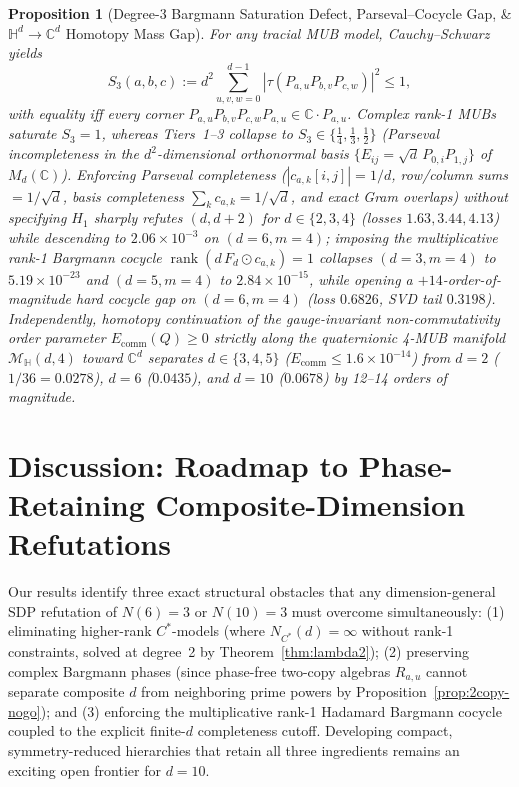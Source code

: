 \documentclass[11pt,a4paper]{article}
\newtheorem{proposition}[theorem]{Proposition}
\theoremstyle{definition}
\newcommand{\C}{\mathbb{C}}
\newcommand{\HH}{\mathbb{H}}
\newcommand{\rank}{\operatorname{rank}}
\begin{document}
\begin{proposition}[Degree-3 Bargmann Saturation Defect, Parseval--Cocycle Gap, \& $\HH^d \to \C^d$ Homotopy Mass Gap]
For any tracial MUB model, Cauchy--Schwarz yields
\[
  S_3(a,b,c) := d^2 \sum_{u,v,w=0}^{d-1} |\tau(P_{a,u} P_{b,v} P_{c,w})|^2 \le 1,
\]
with equality iff every corner $P_{a,u} P_{b,v} P_{c,w} P_{a,u} \in \C \cdot P_{a,u}$. Complex rank-1 MUBs saturate $S_3 = 1$, whereas Tiers~1--3 collapse to $S_3 \in \{\frac{1}{4}, \frac{1}{3}, \frac{1}{2}\}$ (Parseval incompleteness in the $d^2$-dimensional orthonormal basis $\{E_{ij} = \sqrt{d}\, P_{0,i} P_{1,j}\}$ of $M_d(\C)$). Enforcing Parseval completeness ($|c_{a,k}[i,j]| = 1/d$, row/column sums $= 1/\sqrt{d}$, basis completeness $\sum_k c_{a,k} = 1/\sqrt{d}$, and exact Gram overlaps) without specifying $H_1$ sharply refutes $(d, d+2)$ for $d \in \{2,3,4\}$ (losses $1.63, 3.44, 4.13$) while descending to $2.06 \times 10^{-3}$ on $(d=6, m=4)$; imposing the multiplicative rank-1 Bargmann cocycle $\rank(d\, F_d \odot c_{a,k}) = 1$ collapses $(d=3, m=4)$ to $5.19 \times 10^{-23}$ and $(d=5, m=4)$ to $2.84 \times 10^{-15}$, while opening a $+14$-order-of-magnitude hard cocycle gap on $(d=6, m=4)$ (loss $0.6826$, SVD tail $0.3198$). Independently, homotopy continuation of the gauge-invariant non-commutativity order parameter $E_{\mathrm{comm}}(Q) \ge 0$ strictly along the quaternionic 4-MUB manifold $\mathcal{M}_{\HH}(d,4)$ toward $\C^d$ separates $d \in \{3,4,5\}$ ($E_{\mathrm{comm}} \le 1.6 \times 10^{-14}$) from $d=2$ ($1/36 = 0.0278$), $d=6$ ($0.0435$), and $d=10$ ($0.0678$) by 12--14 orders of magnitude.
\end{proposition}

\section{Discussion: Roadmap to Phase-Retaining Composite-Dimension Refutations}

Our results identify three exact structural obstacles that any dimension-general SDP refutation of $N(6)=3$ or $N(10)=3$ must overcome simultaneously: (1) eliminating higher-rank $C^*$-models (where $N_{C^*}(d) = \infty$ without rank-1 constraints, solved at degree~2 by Theorem~\ref{thm:lambda2}); (2) preserving complex Bargmann phases (since phase-free two-copy algebras $R_{a,u}$ cannot separate composite $d$ from neighboring prime powers by Proposition~\ref{prop:2copy-nogo}); and (3) enforcing the multiplicative rank-1 Hadamard Bargmann cocycle coupled to the explicit finite-$d$ completeness cutoff. Developing compact, symmetry-reduced hierarchies that retain all three ingredients remains an exciting open frontier for $d = 10$.
\end{document}
